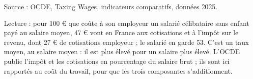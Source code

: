 Source : OCDE, Taxing Wages, indicateurs comparatifs, données 2025.\par Lecture : pour 100 \euro{} que coûte à son employeur un salarié célibataire sans enfant payé au salaire moyen, 47 \euro{} vont en France aux cotisations et à l'impôt sur le revenu, dont 27 \euro{} de cotisations employeur ; le salarié en garde 53. C'est un taux moyen, au salaire moyen : il est plus élevé pour un salaire plus élevé. L'OCDE publie l'impôt et les cotisations en pourcentage du salaire brut ; ils sont ici rapportés au coût du travail, pour que les trois composantes s'additionnent.
